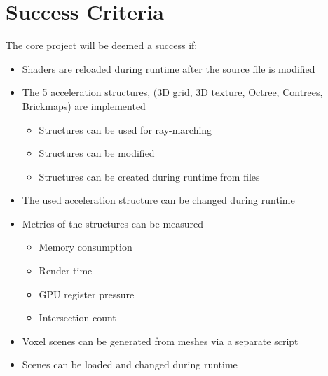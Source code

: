 \section*{Success Criteria}

The core project will be deemed a success if:
\begin{itemize}[noitemsep]
  \item Shaders are reloaded during runtime after the source file is modified
  \item The 5 acceleration structures, (3D grid, 3D texture, Octree,
    Contrees, Brickmaps) are implemented
    \begin{itemize}
      \item Structures can be used for ray-marching
      \item Structures can be modified
      \item Structures can be created during runtime from files
    \end{itemize}
  \item The used acceleration structure can be changed during runtime
  \item Metrics of the structures can be measured
    \begin{itemize}
      \item Memory consumption
      \item Render time
      \item GPU register pressure
      \item Intersection count
    \end{itemize}
  \item Voxel scenes can be generated from meshes via a separate script
  \item Scenes can be loaded and changed during runtime
\end{itemize}
